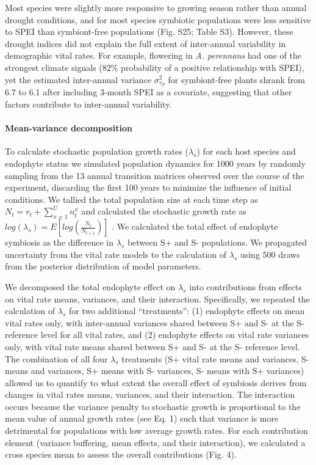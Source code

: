 \documentclass[12pt]{article}
\begin{document}
Most species were slightly more responsive to growing season rather than annual drought conditions, and for most species symbiotic populations were less sensitive to SPEI than symbiont-free populations (Fig. S25; Table S3).
However, these drought indices did not explain the full extent of inter-annual variability in demographic vital rates.
For example, flowering in \emph{A. perennans} had one of the strongest climate signals ($82\%$ probability of a positive relationship with SPEI), yet the estimated inter-annual variance $\sigma^2_{\tau_{P}}$ for symbiont-free plants shrank from 6.7 to 6.1 after including 3-month SPEI as a covariate, suggesting that other factors contribute to inter-annual variability.

\paragraph*{Mean-variance decomposition} To calculate stochastic population growth rates ($\lambda_s$) for each host species and endophyte status we simulated population dynamics for 1000 years by randomly sampling from the 13 annual transition matrices observed over the course of the experiment, discarding the first 100 years to minimize the influence of initial conditions. 
We tallied the total population size at each time step as  $N_{t} = r_{t} + \sum_{x=1}^{U}n^x_{t}$ and calculated the stochastic growth rate as $log(\lambda_s) = E[log(\frac{N_{t}}{N_{t+1}})]$ \cite{caswell2001matrix,rees2009integral}.
We calculated the total effect of endophyte symbiosis as the difference in $\lambda_s$ between S+ and S- populations. 
We propagated uncertainty from the vital rate models to the calculation of $\lambda_s$ using 500 draws from the posterior distribution of model parameters. 

We decomposed the total endophyte effect on $\lambda_s$ into contributions from effects on vital rate means, variances, and their interaction. 
Specifically, we repeated the calculation of $\lambda_s$ for two additional ``treatments'': (1) endophyte effects on mean vital rates only, with inter-annual variances shared between S+ and S- at the S- reference level for all vital rates, and (2) endophyte effects on vital rate variances only, with vital rate means shared between S+ and S- at the S- reference level. 
The combination of all four $\lambda_s$ treatments (S+ vital rate means and variances, S- means and variances, S+ means with S- variances, S- means with S+ variances) allowed us to quantify to what extent the overall effect of symbiosis derives from changes in vital rates means, variances, and their interaction. 
The interaction occurs because the variance penalty to stochastic growth is proportional to the mean value of annual growth rates (see Eq. 1) such that variance is more detrimental for populations with low average growth rates. 
For each contribution element (variance buffering, mean effects, and their interaction), we calculated a cross species mean to assess the overall contributions (Fig. 4).
\end{document}
